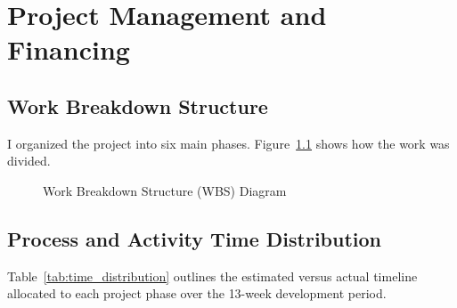 \documentclass[12pt,a4paper,oneside]{report}
\begin{document}
\chapter{Project Management and Financing}

\section{Work Breakdown Structure}
I organized the project into six main phases. Figure~\ref{fig:wbs} shows how the work was divided.

\begin{figure}[H]
    \centering
    \caption{Work Breakdown Structure (WBS) Diagram}
    \label{fig:wbs}
\end{figure}

\section{Process and Activity Time Distribution}
Table~\ref{tab:time_distribution} outlines the estimated versus actual timeline allocated to each project phase over the 13-week development period.
\end{document}
